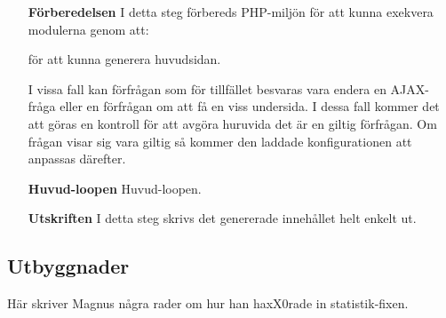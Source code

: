 \begin{itemize}
  \item[\bf Förberedelsen]
    I detta steg förbereds PHP-miljön för att kunna exekvera modulerna genom
    att:
    för att kunna generera huvudsidan.

    I vissa fall kan förfrågan som för tillfället besvaras vara endera en
    AJAX-fråga eller en förfrågan om att få en viss undersida. I dessa fall
    kommer det att göras en kontroll för att avgöra huruvida det är en giltig
    förfrågan. Om frågan visar sig vara giltig så kommer den laddade
    konfigurationen att anpassas därefter.
  \item[\bf Huvud-loopen]
    Huvud-loopen.

  \item[\bf Utskriften]
    I detta steg skrivs det genererade innehållet helt enkelt ut.
\end{itemize}

\subsection{Utbyggnader}
Här skriver Magnus några rader om hur han haxX0rade in statistik-fixen.
